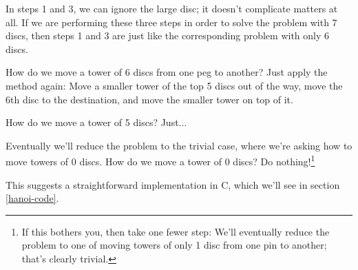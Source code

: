 In steps 1 and 3, we can ignore the large disc; it doesn't complicate
matters at all.  If we are performing these three steps in order to
solve the problem with 7 discs, then steps 1 and 3 are just like the
corresponding problem with only 6 discs.

How do we move a tower of 6 discs from one peg to another?  Just
apply the method again:  Move a smaller tower of the top 5 discs out of
the way, move the 6th disc to the destination, and move the smaller
tower on top of it.

How do we move a tower of 5 discs?  Just...

Eventually we'll reduce the problem to the trivial case, where we're
asking how to move towers of 0 discs.  How do we move a tower of 0
discs?  Do nothing!\footnote{If this bothers you, then take one fewer
step:  We'll eventually reduce the problem to one of moving towers of
only 1 disc from one pin to another; that's clearly trivial.}

This suggests a straightforward implementation in C, which we'll see
in section \ref{hanoi-code}.
